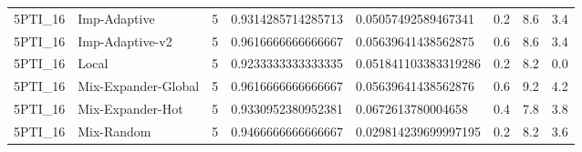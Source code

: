 \begin{tabular}{llllllll}
5PTI\_16 & Imp-Adaptive & 5 & 0.9314285714285713 & 0.05057492589467341 & 0.2 & 8.6 & 3.4 \\
5PTI\_16 & Imp-Adaptive-v2 & 5 & 0.9616666666666667 & 0.05639641438562875 & 0.6 & 8.6 & 3.4 \\
5PTI\_16 & Local & 5 & 0.9233333333333335 & 0.051841103383319286 & 0.2 & 8.2 & 0.0 \\
5PTI\_16 & Mix-Expander-Global & 5 & 0.9616666666666667 & 0.05639641438562876 & 0.6 & 9.2 & 4.2 \\
5PTI\_16 & Mix-Expander-Hot & 5 & 0.9330952380952381 & 0.0672613780004658 & 0.4 & 7.8 & 3.8 \\
5PTI\_16 & Mix-Random & 5 & 0.9466666666666667 & 0.029814239699997195 & 0.2 & 8.2 & 3.6 \\
\bottomrule
\end{tabular}
